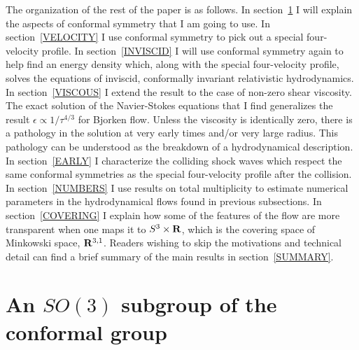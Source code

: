 \documentclass[12pt]{article}
\begin{document}
The organization of the rest of the paper is as follows.  In section~\ref{SUBGROUP} I will explain the aspects of conformal symmetry that I am going to use.  In section~\ref{VELOCITY} I use conformal symmetry to pick out a special four-velocity profile.  In section~\ref{INVISCID} I will use conformal symmetry again to help find an energy density which, along with the special four-velocity profile, solves the equations of inviscid, conformally invariant relativistic hydrodynamics.  In section~\ref{VISCOUS} I extend the result to the case of non-zero shear viscosity.  The exact solution of the Navier-Stokes equations that I find generalizes the result $\epsilon \propto 1/\tau^{4/3}$ for Bjorken flow.  Unless the viscosity is identically zero, there is a pathology in the solution at very early times and/or very large radius.  This pathology can be understood as the breakdown of a hydrodynamical description.  In section~\ref{EARLY} I characterize the colliding shock waves which respect the same conformal symmetries as the special four-velocity profile after the collision.  In section~\ref{NUMBERS} I use results on total multiplicity to estimate numerical parameters in the hydrodynamical flows found in previous subsections.  In section~\ref{COVERING} I explain how some of the features of the flow are more transparent when one maps it to $S^3 \times {\bf R}$, which is the covering space of Minkowski space, ${\bf R}^{3,1}$.  Readers wishing to skip the motivations and technical detail can find a brief summary of the main results in section~\ref{SUMMARY}.




\section{An $SO(3)$ subgroup of the conformal group}
\label{SUBGROUP}
\end{document}
